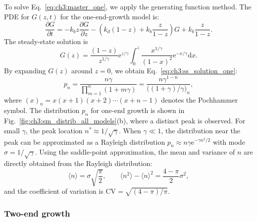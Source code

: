 To solve Eq.~\eqref{eq:ch3:master_one}, we apply the generating function method. The PDE for $G(z,t)$ for the one-end-growth model is:
\begin{equation}
    \frac{\partial G}{\partial t}=-k_b z \frac{\partial G}{\partial z} - \left(k_d(1-z)+k_b\frac{z}{1-z}\right)G+k_b\frac{z}{1-z}.
\end{equation}
The steady-state solution is
\begin{equation}
    G(z)=\frac{(1-z)}{z^{1/\gamma}}\mathrm{e}^{z/\gamma}\int_0^z\frac{x^{1/\gamma}}{(1-x)^2}\mathrm{e}^{-x/\gamma}\mathrm{d}x.
\end{equation}
By expanding $G(z)$ around $z=0$, we obtain Eq.~\eqref{eq:ch3:ss_solution_one}:
\begin{equation}\label{eq:ch3:app_pn_1}
    p_n=\frac{n\gamma}{\prod_{m=1}^n(1+m\gamma)}=\frac{n\gamma^{1-n}}{\bm{(}(1+\gamma)/\gamma\bm{)}_n},
\end{equation}
where $(x)_n=x(x+1)(x+2)\cdots(x+n-1)$ denotes the Pochhammer symbol. The distribution $p_n$ for one-end growth is shown in Fig.~\ref{fig:ch3:sm_distrib_all_models}(b), where a distinct peak is observed. For small $\gamma$, the peak location $n^\ast\approx 1/\sqrt{\gamma}$. When $\gamma\ll 1$, the distribution near the peak can be approximated as a Rayleigh distribution $p_n\approx n\gamma \mathrm{e}^{-\gamma n^2/2}$ with mode $\sigma=1/\sqrt{\gamma}$. Using the saddle-point approximation, the mean and variance of $n$ are directly obtained from the Rayleigh distribution:
\begin{equation}
    \langle n\rangle=\sigma\sqrt{\frac{\pi}{2}},\qquad\langle n^2\rangle -\langle n\rangle^2 = \frac{4-\pi}{2}\sigma^2,
\end{equation}
and the coefficient of variation is $\mathrm{CV} = \sqrt{(4-\pi)/\pi}$.


\subsubsection{Two-end growth}
\label{sec:ch3:gen_func_3}


